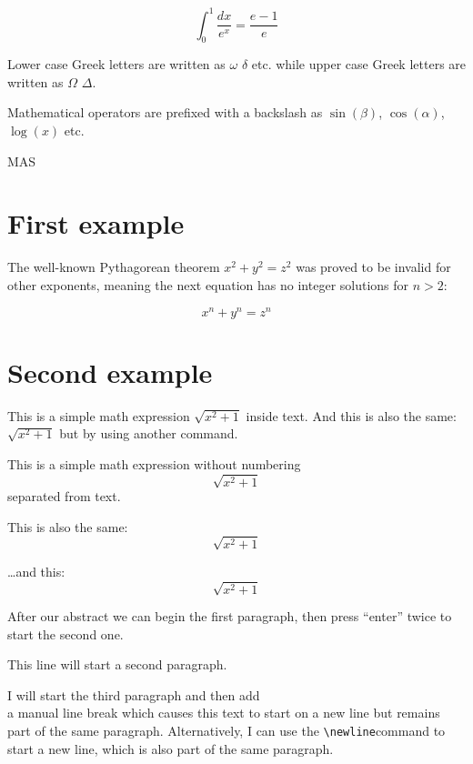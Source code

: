\[ \int_0^1 \frac{dx}{e^x} =  \frac{e-1}{e} \]

Lower case Greek letters are written as $\omega$ $\delta$ etc. while upper case Greek letters are written as $\Omega$ $\Delta$.

Mathematical operators are prefixed with a backslash as $\sin(\beta)$, $\cos(\alpha)$, $\log(x)$ etc.



MAS

\section*{First example}

The well-known Pythagorean theorem \(x^2 + y^2 = z^2\) was proved to be invalid for other exponents, meaning the next equation has no integer solutions for \(n>2\):

\[ x^n + y^n = z^n \]

\section*{Second example}

This is a simple math expression \(\sqrt{x^2+1}\) inside text. 
And this is also the same: 
\begin{math}
\sqrt{x^2+1}
\end{math}
but by using another command.

This is a simple math expression without numbering
\[\sqrt{x^2+1}\] 
separated from text.

This is also the same:
\begin{displaymath}
\sqrt{x^2+1}
\end{displaymath}

\ldots and this:
\begin{equation*}
\sqrt{x^2+1}
\end{equation*}




\begin{abstract}
This is a simple paragraph at the beginning of the 
document. A brief introduction about the main subject.
\end{abstract}

After our abstract we can begin the first paragraph, then press ``enter'' twice to start the second one.

This line will start a second paragraph.

I will start the third paragraph and then add \\ a manual line break which causes this text to start on a new line but remains part of the same paragraph. Alternatively, I can use the \verb|\newline|\newline command to start a new line, which is also part of the same paragraph.




